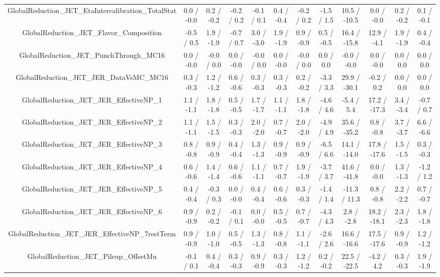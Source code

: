 \begin{table}[htbp]
\begin{center}
\begin{tabular}{|c|c|c|c|c|c|c|c|c|c|c|c|}
  GlobalReduction_JET_EtaIntercalibration_TotalStat & 0.0 / -0.0 & 0.2 / -0.2 & -0.2 / 0.2 & -0.1 / 0.1 & 0.4 / -0.4 & -0.2 / 0.2 & -1.5 / 1.5 & 10.5 / -10.5 & 0.0 / -0.0 & 0.2 / -0.2 & 0.1 / -0.1 \\ 
  GlobalReduction_JET_Flavor_Composition & -0.5 / 0.5 & 1.9 / -1.9 & -0.7 / 0.7 & 3.0 / -3.0 & 1.9 / -1.9 & 0.9 / -0.9 & 0.5 / -0.5 & 16.4 / -15.8 & 12.9 / -4.1 & 1.9 / -1.9 & 0.4 / -0.4 \\ 
  GlobalReduction_JET_PunchThrough_MC16 & 0.0 / -0.0 & -0.0 / 0.0 & 0.0 / -0.0 & -0.0 / 0.0 & 0.0 / -0.0 & -0.0 / 0.0 & 0.0 / 0.0 & -0.0 / -0.0 & 0.0 / -0.0 & 0.0 / 0.0 & 0.0 / 0.0 \\ 
  GlobalReduction_JET_JER_DataVsMC_MC16 & 0.3 / -0.3 & 1.2 / -1.2 & 0.6 / -0.6 & 0.3 / -0.3 & 0.3 / -0.3 & 0.2 / -0.2 & -3.3 / 3.3 & 29.9 / -30.1 & -0.2 / 0.2 & 0.0 / 0.0 & 0.0 / 0.0 \\ 
  GlobalReduction_JET_JER_EffectiveNP_1 & 1.1 / -1.1 & 1.8 / -1.8 & 0.5 / -0.5 & 1.7 / -1.7 & 1.1 / -1.1 & 1.8 / -1.8 & -4.6 / 4.6 & -5.4 / 5.4 & 17.2 / -17.3 & 3.4 / -3.4 & -0.7 / 0.7 \\ 
  GlobalReduction_JET_JER_EffectiveNP_2 & 1.1 / -1.1 & 1.5 / -1.5 & 0.3 / -0.3 & 2.0 / -2.0 & 0.7 / -0.7 & 2.0 / -2.0 & -4.9 / 4.9 & 35.6 / -35.2 & 0.8 / -0.8 & 3.7 / -3.7 & 6.6 / -6.6 \\ 
  GlobalReduction_JET_JER_EffectiveNP_3 & 0.8 / -0.8 & 0.9 / -0.9 & 0.4 / -0.4 & 1.3 / -1.3 & 0.9 / -0.9 & 0.9 / -0.9 & -6.5 / 6.6 & 14.1 / -14.0 & 17.8 / -17.6 & 1.5 / -1.5 & 0.3 / -0.3 \\ 
  GlobalReduction_JET_JER_EffectiveNP_4 & 0.6 / -0.6 & 1.4 / -1.4 & 0.6 / -0.6 & 1.1 / -1.1 & 0.7 / -0.7 & 1.9 / -1.9 & -3.7 / 3.7 & 41.6 / -41.8 & 0.0 / -0.0 & 1.3 / -1.3 & -1.2 / 1.2 \\ 
  GlobalReduction_JET_JER_EffectiveNP_5 & 0.4 / -0.4 & -0.3 / 0.3 & 0.0 / -0.0 & 0.4 / -0.4 & 0.6 / -0.6 & 0.3 / -0.3 & -1.4 / 1.4 & -11.3 / 11.3 & 0.8 / -0.8 & 2.2 / -2.2 & 0.7 / -0.7 \\ 
  GlobalReduction_JET_JER_EffectiveNP_6 & 0.9 / -0.9 & 0.2 / -0.2 & -0.1 / 0.1 & 0.0 / -0.0 & 0.5 / -0.5 & 0.7 / -0.7 & -4.3 / 4.3 & 2.8 / -2.8 & 18.2 / -18.1 & 2.3 / -2.3 & 1.8 / -1.8 \\ 
  GlobalReduction_JET_JER_EffectiveNP_7restTerm & 0.9 / -0.9 & 1.0 / -1.0 & 0.5 / -0.5 & 1.3 / -1.3 & 0.8 / -0.8 & 1.1 / -1.1 & -2.6 / 2.6 & 16.6 / -16.6 & 17.5 / -17.6 & 0.9 / -0.9 & 1.2 / -1.2 \\ 
  GlobalReduction_JET_Pileup_OffsetMu & -0.1 / 0.1 & 0.4 / -0.4 & 0.3 / -0.3 & 0.9 / -0.9 & 0.3 / -0.3 & 1.2 / -1.2 & 0.2 / -0.2 & 22.5 / -22.5 & -4.2 / 4.2 & 0.3 / -0.3 & 1.9 / -1.9 \\ 

\end{tabular}
\end{center}
\end{table}
